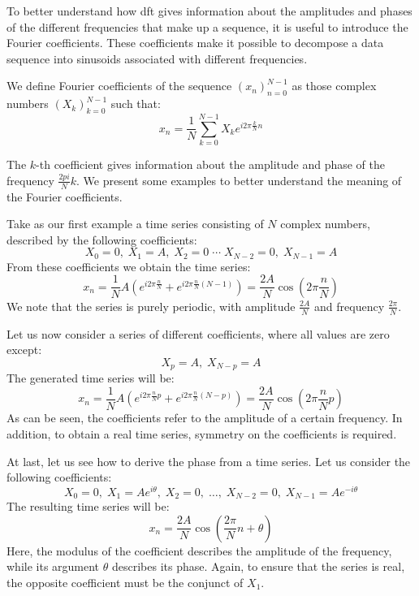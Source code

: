 \noindent To better understand how \gls{dft} gives information about the amplitudes and phases of the different frequencies that make up a sequence, it is useful to introduce the Fourier coefficients. These coefficients make it possible to decompose a data sequence into sinusoids associated with different frequencies.
\begin{definition}
	We define Fourier coefficients of the sequence $(x_n)_{n=0}^{N-1}$ as those complex numbers $(X_k)_{k=0}^{N-1}$ such that:
	\begin{equation}
		x_n = \frac{1}{N}\sum_{k=0}^{N-1} X_k e^{i2\pi\frac{k}{N}n}
	\end{equation}
\end{definition}

\noindent The $k$-th coefficient gives information about the amplitude and phase of the frequency $\frac{2pi}{N}k$. We present some examples to better understand the meaning of the Fourier coefficients.
\begin{exempli_gratia}
	Take as our first example a time series consisting of $N$ complex numbers, described by the following coefficients:
	\[
		X_0=0,\;X_1=A,\;X_2=0\;\cdots\;X_{N-2}=0,\;X_{N-1}=A
	\]
	From these coefficients we obtain the time series:
	\[
		x_n = \frac{1}{N}A\left(e^{i2\pi \frac{n}{N}} + e^{i2\pi \frac{n}{N}(N-1)}\right) = \frac{2A}{N}\cos\left(2\pi\frac{n}{N}\right)
	\]
	We note that the series is purely periodic, with amplitude $\frac{2A}{N}$ and frequency $\frac{2\pi}{N}$.

	\bigskip
	\noindent Let us now consider a series of different coefficients, where all values are zero except:
	\[
		X_p=A,\;X_{N-p}=A
	\]
	The generated time series will be:
    \[
		x_n = \frac{1}{N}A\left(e^{i2\pi \frac{n}{N}p} + e^{i2\pi \frac{n}{N}(N-p)}\right) = \frac{2A}{N}\cos\left(2\pi\frac{n}{N}p\right)
	\]
	As can be seen, the coefficients refer to the amplitude of a certain frequency. In addition, to obtain a real time series, symmetry on the coefficients is required.

	\bigskip
	\noindent At last, let us see how to derive the phase from a time series. Let us consider the following coefficients:
	\[
		X_0=0,\;X_1=Ae^{i\theta},\;X_2=0,\;\dots,\;X_{N-2}=0,\;X_{N-1}=Ae^{-i\theta}
	\]
	The resulting time series will be:
    \[
		x_n = \frac{2A}{N}\cos\left(\frac{2\pi}{N}n + \theta\right)
	\]
	Here, the modulus of the coefficient describes the amplitude of the frequency, while its argument $\theta$ describes its phase. Again, to ensure that the series is real, the opposite coefficient must be the conjunct of $X_1$.
\end{exempli_gratia}

